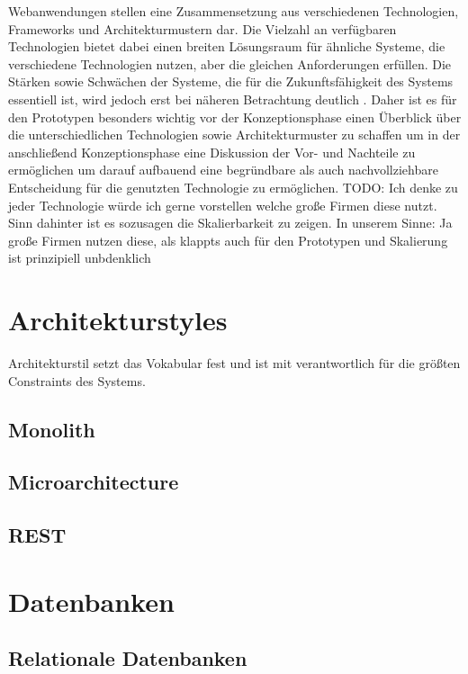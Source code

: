 


\label{sec:technologievorstellung}
Webanwendungen stellen eine Zusammensetzung aus verschiedenen Technologien, Frameworks und Architekturmustern dar. Die Vielzahl an verfügbaren Technologien bietet dabei einen breiten Lösungsraum für ähnliche Systeme, die verschiedene Technologien nutzen, aber die gleichen Anforderungen erfüllen. Die Stärken sowie Schwächen der Systeme, die für die Zukunftsfähigkeit des Systems essentiell ist, wird jedoch erst bei näheren Betrachtung deutlich .
Daher ist es für den Prototypen besonders wichtig vor der Konzeptionsphase einen Überblick über die unterschiedlichen Technologien sowie Architekturmuster zu schaffen um in der anschließend Konzeptionsphase eine Diskussion der Vor- und Nachteile zu ermöglichen um darauf aufbauend eine begründbare als auch nachvollziehbare Entscheidung für die genutzten Technologie zu ermöglichen.
TODO: Ich denke zu jeder Technologie würde ich gerne vorstellen welche große Firmen diese nutzt. Sinn dahinter ist es sozusagen die Skalierbarkeit zu zeigen. In unserem Sinne: Ja große Firmen nutzen diese, als klappts auch für den Prototypen und Skalierung ist prinzipiell unbdenklich


\section{Architekturstyles}
Architekturstil setzt das Vokabular fest und ist mit verantwortlich für die größten Constraints des Systems.
\subsection{Monolith}
\subsection{Microarchitecture}
\subsection{REST}


\section{Datenbanken}

\subsection{Relationale Datenbanken}
